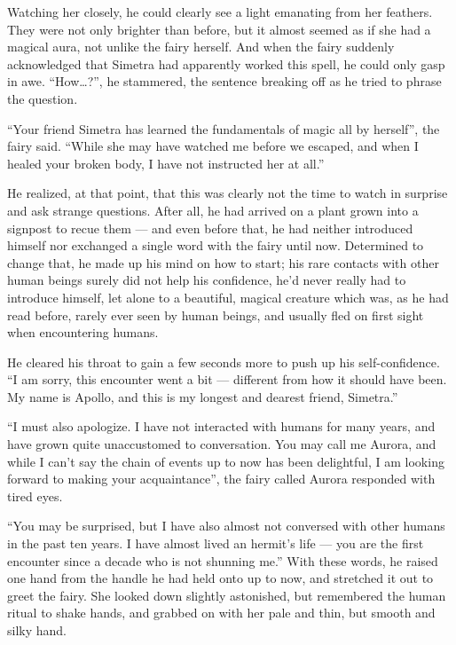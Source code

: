 Watching her closely, he could clearly see a light emanating from her feathers. They were not only brighter than before, but it almost seemed as if she had a magical aura, not unlike the fairy herself. And when the fairy suddenly acknowledged that Simetra had apparently worked this spell, he could only gasp in awe. \enquote{How\dots{}?}, he stammered, the sentence breaking off as he tried to phrase the question.

\enquote{Your friend Simetra has learned the fundamentals of magic all by herself}, the fairy said. \enquote{While she may have watched me before we escaped, and when I healed your broken body, I have not instructed her at all.}

He realized, at that point, that this was clearly not the time to watch in surprise and ask strange questions. After all, he had arrived on a plant grown into a signpost to recue them --- and even before that, he had neither introduced himself nor exchanged a single word with the fairy until now. Determined to change that, he made up his mind on how to start; his rare contacts with other human beings surely did not help his confidence, he'd never really had to introduce himself, let alone to a beautiful, magical creature which was, as he had read before, rarely ever seen by human beings, and usually fled on first sight when encountering humans.

He cleared his throat to gain a few seconds more to push up his self-confidence. \enquote{I am sorry, this encounter went a bit --- different from how it should have been. My name is Apollo, and this is my longest and dearest friend, Simetra.}

\enquote{I must also apologize. I have not interacted with humans for many years, and have grown quite unaccustomed to conversation. You may call me Aurora, and while I can't say the chain of events up to now has been delightful, I am looking forward to making your acquaintance}, the fairy called Aurora responded with tired eyes.

\enquote{You may be surprised, but I have also almost not conversed with other humans in the past ten years. I have almost lived an hermit's life --- you are the first encounter since a decade who is not shunning me.} With these words, he raised one hand from the handle he had held onto up to now, and stretched it out to greet the fairy. She looked down slightly astonished, but remembered the human ritual to shake hands, and grabbed on with her pale and thin, but smooth and silky hand.

